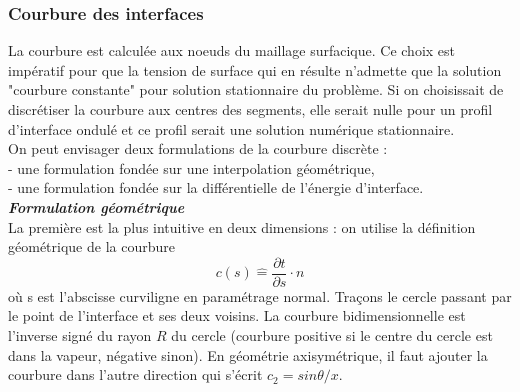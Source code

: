 \subsubsection{Courbure des interfaces}

La courbure est calcul\'ee aux noeuds du maillage surfacique. Ce choix est imp\'eratif pour que la tension de surface qui en r\'esulte n'admette que la solution "courbure constante" pour solution stationnaire du probl\`eme. Si on choisissait de discr\'etiser la courbure aux centres des segments, elle serait nulle pour un profil d'interface ondul\'e et ce profil serait une solution num\'erique stationnaire.\\
On peut envisager deux formulations de la courbure discr\`ete :\\
- une formulation fond\'ee sur une interpolation g\'eom\'etrique,\\
- une formulation fond\'ee sur la diff\'erentielle de l'\'energie d'interface.\smallskip \\

\textit{\textbf{Formulation g\'eom\'etrique}}\smallskip \\

La première est la plus intuitive en deux dimensions : on utilise la d\'efinition g\'eom\'etrique de la courbure
\begin{equation}
c(s) \hat{=} \frac{\partial t}{\partial s} \cdot n
\end{equation}
o\`u s est l'abscisse curviligne en param\'etrage normal. Tra\c cons le cercle passant par le point de l'interface et ses deux voisins. La courbure bidimensionnelle est l'inverse sign\'e du rayon $R$ du cercle (courbure positive si le centre du cercle est dans la vapeur, n\'egative sinon). En g\'eom\'etrie axisym\'etrique, il faut ajouter la courbure dans l'autre direction qui s'\'ecrit $c_{2} = sin \theta / x$.

